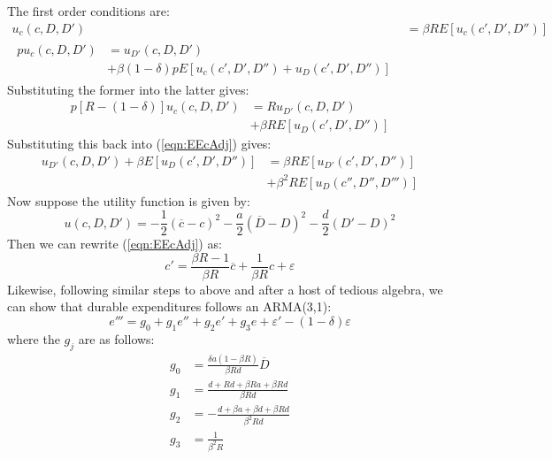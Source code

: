 The first order conditions are:
%
\begin{align}
 u_c(c, D, D') &= \beta R E \left[u_c(c', D', D'')\right] \label{eqn:EEcAdj} \\
 \begin{split} 
 p u_c(c, D, D') &= u_{D'}(c, D, D') \\
 &+ \beta (1 - \delta) p E \left[u_c(c', D', D'') + u_D(c', D', D'')\right]
 \end{split}
\end{align}
%
Substituting the former into the latter gives:
%
\begin{equation}
 \begin{split} 
	p[R - (1 - \delta)] u_c(c, D, D') &= R u_{D'}(c, D, D') \\
	&+ \beta R E \left[u_D(c', D', D'')\right]
 \end{split}
\end{equation}
%
Substituting this back into (\ref{eqn:EEcAdj}) gives:
%
\begin{equation}
 \begin{split} 
	u_{D'}(c, D, D') + \beta E \left[u_D(c', D', D'')\right] &= \beta R E \left[ u_{D'}(c', D', D'')\right] \\
	&+ \beta^2 R E \left[u_D(c'', D'', D''')\right]
 \end{split}
\end{equation}
%
Now suppose the utility function is given by:
%
\begin{equation}
 u(c, D, D') = -\frac{1}{2}(\overline{c} - c)^2 - \frac{a}{2}(\overline{D} - D)^2  - \frac{d}{2}(D' - D)^2
\end{equation}
%
Then we can rewrite (\ref{eqn:EEcAdj}) as:
%
\begin{equation}
	c' = \frac{\beta R - 1}{\beta R}\overline{c} + \frac{1}{\beta R}c + \varepsilon
\end{equation}
%
Likewise, following similar steps to above and after a host of tedious algebra, we can show that durable expenditures follows an ARMA(3,1):
%
\begin{equation}
	e''' = g_0 + g_1 e'' + g_2 e' + g_3 e + \varepsilon' - (1 - \delta) \varepsilon
\end{equation}
%
where the \(g_j\) are as follows:
%
\begin{align}
	g_0 &= \frac{\delta a(1 - \beta R)}{\beta R d} \overline{D} \\
	g_1 &= \frac{d + Rd + \beta Ra + \beta Rd}{\beta Rd} \\
	g_2 &= - \frac{d + \beta a + \beta d + \beta Rd}{\beta^2 R d} \\
	g_3 &= \frac{1}{\beta^2 R}
\end{align}
%

